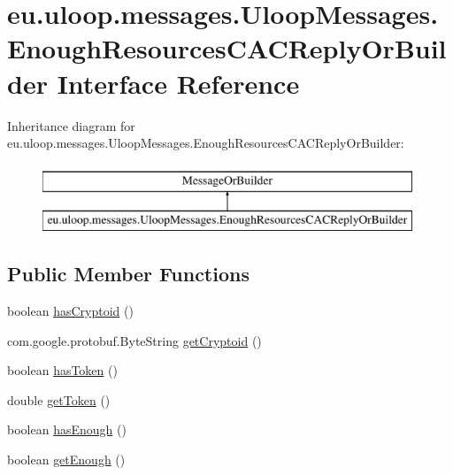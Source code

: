 \hypertarget{interfaceeu_1_1uloop_1_1messages_1_1UloopMessages_1_1EnoughResourcesCACReplyOrBuilder}{\section{eu.\+uloop.\+messages.\+Uloop\+Messages.\+Enough\+Resources\+C\+A\+C\+Reply\+Or\+Builder Interface Reference}
\label{interfaceeu_1_1uloop_1_1messages_1_1UloopMessages_1_1EnoughResourcesCACReplyOrBuilder}
}
Inheritance diagram for eu.\+uloop.\+messages.\+Uloop\+Messages.\+Enough\+Resources\+C\+A\+C\+Reply\+Or\+Builder\+:\begin{figure}[H]
\begin{center}
\leavevmode
\includegraphics[height=2.000000cm]{interfaceeu_1_1uloop_1_1messages_1_1UloopMessages_1_1EnoughResourcesCACReplyOrBuilder}
\end{center}
\end{figure}
\subsection*{Public Member Functions}
\begin{DoxyCompactItemize}
\item 
boolean \hyperlink{interfaceeu_1_1uloop_1_1messages_1_1UloopMessages_1_1EnoughResourcesCACReplyOrBuilder_a65bdb4101a40652cea28e9b73d9980cb}{has\+Cryptoid} ()
\item 
com.\+google.\+protobuf.\+Byte\+String \hyperlink{interfaceeu_1_1uloop_1_1messages_1_1UloopMessages_1_1EnoughResourcesCACReplyOrBuilder_a4f76439ceffbcd6ba2a1bb5fe94f597d}{get\+Cryptoid} ()
\item 
boolean \hyperlink{interfaceeu_1_1uloop_1_1messages_1_1UloopMessages_1_1EnoughResourcesCACReplyOrBuilder_a7889ec7d12caede1d8d5a0d72f59b111}{has\+Token} ()
\item 
double \hyperlink{interfaceeu_1_1uloop_1_1messages_1_1UloopMessages_1_1EnoughResourcesCACReplyOrBuilder_a4b92ba29b9bd907521fa58152bdfd875}{get\+Token} ()
\item 
boolean \hyperlink{interfaceeu_1_1uloop_1_1messages_1_1UloopMessages_1_1EnoughResourcesCACReplyOrBuilder_a67bc890403e0405914392d7deefb60a2}{has\+Enough} ()
\item 
boolean \hyperlink{interfaceeu_1_1uloop_1_1messages_1_1UloopMessages_1_1EnoughResourcesCACReplyOrBuilder_af75fa7e695738173b3403f510354299f}{get\+Enough} ()
\end{DoxyCompactItemize}


